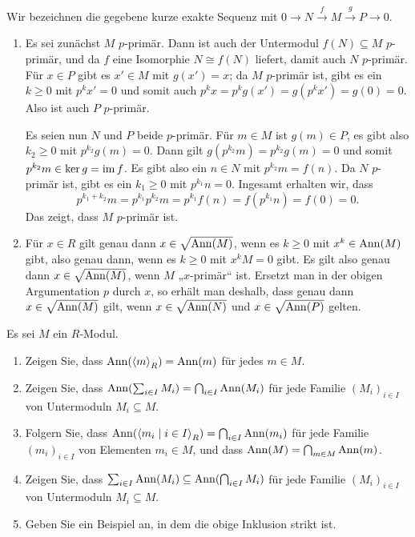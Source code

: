 \begin{solution}
  Wir bezeichnen die gegebene kurze exakte Sequenz mit $0 \to N \xrightarrow{f} M \xrightarrow{g} P \to 0$.
  \begin{enumerate}
    \item
      Es sei zunächst $M$ $p$-primär.
      Dann ist auch der Untermodul $f(N) \subseteq M$ $p$-primär, und da $f$ eine Isomorphie $N \cong f(N)$ liefert, damit auch $N$ $p$-primär.
      Für $x \in P$ gibt es $x' \in M$ mit $g(x') = x$; da $M$ $p$-primär ist, gibt es ein $k \geq 0$ mit $p^k x' = 0$ und somit auch $p^k x = p^k g(x') = g(p^k x') = g(0) = 0$.
      Also ist auch $P$ $p$-primär.
      
      Es seien nun $N$ und $P$ beide $p$-primär.
      Für $m \in M$ ist $g(m) \in P$, es gibt also $k_2 \geq 0$ mit $p^{k_2} g(m) = 0$.
      Dann gilt $g(p^{k_2} m) = p^{k_2} g(m) = 0$ und somit $p^{k_2} m \in \ker g = \operatorname{im} f$.
      Es gibt also ein $n \in N$ mit $p^{k_2} m = f(n)$.
      Da $N$ $p$-primär ist, gibt es ein $k_1 \geq 0$ mit $p^{k_1} n = 0$.
      Ingesamt erhalten wir, dass
      \[
          p^{k_1 + k_2} m
        = p^{k_1} p^{k_2} m
        = p^{k_1} f(n)
        = f(p^{k_1} n)
        = f(0)
        = 0.
      \]
      Das zeigt, dass $M$ $p$-primär ist.
    \item
      Für $x \in R$ gilt genau dann $x \in \sqrt{\operatorname{Ann}(M)}$, wenn es $k \geq 0$ mit $x^k \in \operatorname{Ann}(M)$ gibt, also genau dann, wenn es $k \geq 0$ mit $x^k M = 0$ gibt.
      Es gilt also genau dann $x \in \sqrt{\operatorname{Ann}(M)}$, wenn $M$ „$x$-primär“ ist.
      Ersetzt man in der obigen Argumentation $p$ durch $x$, so erhält man deshalb, dass genau dann $x \in \sqrt{\operatorname{Ann}(M)}$ gilt, wenn $x \in \sqrt{\operatorname{Ann}(N)}$ und $x \in \sqrt{\operatorname{Ann}(P)}$ gelten.
  \end{enumerate}
\end{solution}


\begin{question}
  Es sei $M$ ein $R$-Modul.
  \begin{enumerate}
    \item
      Zeigen Sie, dass $\operatorname{Ann}( \left\langle m \right\rangle_R ) = \operatorname{Ann}(m)$ für jedes $m \in M$.
    \item
      Zeigen Sie, dass $\operatorname{Ann}( \sum_{i \in I} M_i) = \bigcap_{i \in I} \operatorname{Ann}(M_i)$ für jede Familie $(M_i)_{i \in I}$ von Untermoduln $M_i \subseteq M$.
    \item
      Folgern Sie, dass $\operatorname{Ann}( \left\langle m_i \mid i \in I \right\rangle_R ) = \bigcap_{i \in I} \operatorname{Ann}(m_i)$ für jede Familie $(m_i)_{i \in I}$ von Elementen $m_i \in M$, und dass $\operatorname{Ann}(M) = \bigcap_{m \in M} \operatorname{Ann}(m)$.
    \item
      Zeigen Sie, dass $\sum_{i \in I} \operatorname{Ann}(M_i) \subseteq \operatorname{Ann}( \bigcap_{i \in I} M_i)$ für jede Familie $(M_i)_{i \in I}$ von Untermoduln $M_i \subseteq M$.
    \item
      Geben Sie ein Beispiel an, in dem die obige Inklusion strikt ist.
  \end{enumerate}
\end{question}


